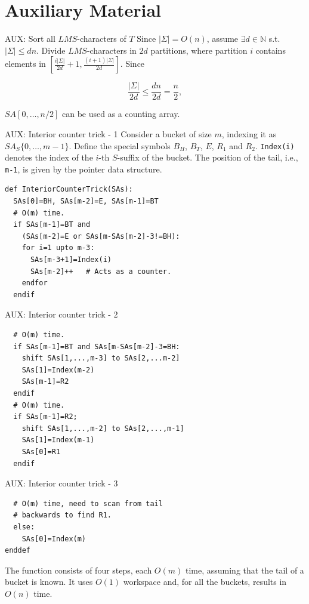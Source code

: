 \documentclass{beamer}
\begin{document}
  \section{Auxiliary Material}
  \begin{frame}{AUX: Sort all $LMS$-characters of $T$}\label{AUX1}
    Since $|\Sigma| = O(n)$, assume $\exists d \in \mathbb{N}$ s.t. $|\Sigma| \le dn$. Divide $LMS$-characters in $2d$ partitions, where partition $i$ contains elements in $\left[ \frac{i|\Sigma|}{2d} +1, \frac{(i+1)|\Sigma|}{2d} \right]$. Since

    $$\frac{|\Sigma|}{2d} \le \frac{dn}{2d} = \frac{n}{2},$$

    $SA[0, \dots, n/2]$ can be used as a counting array. \hyperlink{1}{\beamerbutton{$\hookleftarrow$}}
  \end{frame}

  \begin{frame}[fragile]{AUX: Interior counter trick - 1}\label{AUX5.counter}
    Consider a bucket of size $m$, indexing it as $SA_S \{0, \dots, m-1 \}$. Define the special symbols $B_H$, $B_T$, $E$, $R_1$ and $R_2$. \texttt{Index(i)} denotes the index of the $i$-th $S$-suffix of the bucket. The position of the tail, i.e., \texttt{m-1}, is given by the pointer data structure.
    \begin{lstlisting}
def InteriorCounterTrick(SAs):
  SAs[0]=BH, SAs[m-2]=E, SAs[m-1]=BT
  # O(m) time.
  if SAs[m-1]=BT and
    (SAs[m-2]=E or SAs[m-SAs[m-2]-3!=BH):
    for i=1 upto m-3:
      SAs[m-3+1]=Index(i)
      SAs[m-2]++   # Acts as a counter.
    endfor
  endif
    \end{lstlisting}
  \end{frame}

  \begin{frame}[fragile]{AUX: Interior counter trick - 2}
    \begin{lstlisting}
  # O(m) time.
  if SAs[m-1]=BT and SAs[m-SAs[m-2]-3=BH:
    shift SAs[1,...,m-3] to SAs[2,...m-2]
    SAs[1]=Index(m-2)
    SAs[m-1]=R2
  endif
  # O(m) time.
  if SAs[m-1]=R2;
    shift SAs[1,...,m-2] to SAs[2,...,m-1]
    SAs[1]=Index(m-1)
    SAs[0]=R1
  endif
    \end{lstlisting}
  \end{frame}

  \begin{frame}[fragile]{AUX: Interior counter trick - 3}

    \begin{lstlisting}
  # O(m) time, need to scan from tail
  # backwards to find R1.
  else:
    SAs[0]=Index(m)
enddef
    \end{lstlisting}

    The function consists of four steps, each $O(m)$ time, assuming that the tail of a bucket is known. It uses $O(1)$ workspace and, for all the buckets, results in $O(n)$ time. \hyperlink{5}{\beamerbutton{$\hookleftarrow$}}

  \end{frame}
\end{document}
